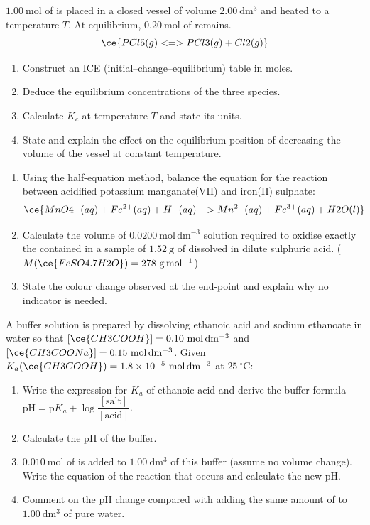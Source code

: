 \documentclass[11pt]{article}
\newcounter{popsec}
\newcounter{popsub}
\newcommand{\courssub}[1]{%
  \stepcounter{popsub}%
  \par\vspace{9pt}\noindent{\popxbold\fontsize{11.5}{13}\selectfont\color{popink}{\color{poporange}\thepopsec.\thepopsub}\hspace{6pt}#1}\par\nopagebreak\vspace{4pt}
}
\begin{document}
\courssub{I practise}

\begin{exercice}
$1.00\ \mathrm{mol}$ of  is placed in a closed vessel of volume $2.00\ \mathrm{dm^{3}}$ and heated to a temperature $T$. At equilibrium, $0.20\ \mathrm{mol}$ of  remains.
\[\ce{PCl5(g) <=> PCl3(g) + Cl2(g)}\]
\begin{enumerate}
\item Construct an ICE (initial--change--equilibrium) table in moles.
\item Deduce the equilibrium concentrations of the three species.
\item Calculate $K_c$ at temperature $T$ and state its units.
\item State and explain the effect on the equilibrium position of decreasing the volume of the vessel at constant temperature.
\end{enumerate}
\end{exercice}

\begin{exercice}
\begin{enumerate}
\item Using the half-equation method, balance the equation for the reaction between acidified potassium manganate(VII) and iron(II) sulphate:
\[\ce{MnO4^{-}(aq) + Fe^{2+}(aq) + H^{+}(aq) -> Mn^{2+}(aq) + Fe^{3+}(aq) + H2O(l)}\]
\item Calculate the volume of $0.0200\ \mathrm{mol\,dm^{-3}}$  solution required to oxidise exactly the  contained in a sample of $1.52\ \mathrm{g}$ of  dissolved in dilute sulphuric acid. ($M(\ce{FeSO4.7H2O}) = 278\ \mathrm{g\,mol^{-1}}$)
\item State the colour change observed at the end-point and explain why no indicator is needed.
\end{enumerate}
\end{exercice}

\begin{exercice}
A buffer solution is prepared by dissolving ethanoic acid and sodium ethanoate in water so that $[\ce{CH3COOH}] = 0.10\ \mathrm{mol\,dm^{-3}}$ and $[\ce{CH3COONa}] = 0.15\ \mathrm{mol\,dm^{-3}}$. Given $K_a(\ce{CH3COOH}) = 1.8\times 10^{-5}\ \mathrm{mol\,dm^{-3}}$ at $25\ ^{\circ}\mathrm{C}$:
\begin{enumerate}
\item Write the expression for $K_a$ of ethanoic acid and derive the buffer formula $\mathrm{pH} = \mathrm{p}K_a + \log\dfrac{[\text{salt}]}{[\text{acid}]}$.
\item Calculate the pH of the buffer.
\item $0.010\ \mathrm{mol}$ of  is added to $1.00\ \mathrm{dm^{3}}$ of this buffer (assume no volume change). Write the equation of the reaction that occurs and calculate the new pH.
\item Comment on the pH change compared with adding the same amount of  to $1.00\ \mathrm{dm^{3}}$ of pure water.
\end{enumerate}
\end{exercice}
\end{document}
